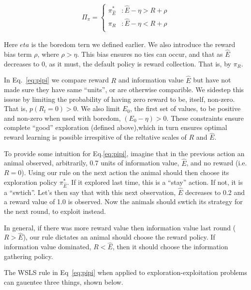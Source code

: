 \begin{equation} 
    \label{eq:pipi}
    \begin{split}
        \Pi_{\pi} = 
        \begin{cases}
            \pi^*_{\hat{E}} & : \hat{E} - \eta > R + \rho \\
            \pi_R 	& : \hat{E} - \eta < R + \rho \\
        \end{cases}
    \end{split}
\end{equation}

Here $eta$ is the boredom tern we defined earlier. We also introduce the reward bias term $\rho$, where $\rho > \eta$. This bias ensures no ties can occur, and that as $\hat E$ decreases to 0, as it must, the default policy is reward collection. That is, by $\pi_R$.

In Eq.~\ref{eq:pipi} we compare reward $R$ and information value $\hat E$ but have not made sure they have same ``units'', or are otherwise comparible. We sidestep this isssue by limiting the probability of having zero reward to be, itself, non-zero. That is, $p(R_t=0) > 0$. We also limit $E_0$, the first set of values, to be positive and non-zero when used with boredom, $(E_0 - \eta) > 0$. These constraints ensure complete ``good'' exploration (defined above),which in turn ensures optimal reward learning is possible irrespitive of the reltative scales of $R$ and $\hat E$.

To provide some intuition for Eq.\ref{eq:pipi}, imagine that in the previous action an animal observed, arbitrarily, 0.7 units of information value, $\hat E$, and no reward (i.e. $R = 0$). Using our rule on the next action the animal should then choose its exploration policy $\pi^*_{\hat{E}}$. If it explored last time, this is a ``stay'' action. If not, it is a ``swtich''. Let's then say that with this next observation, $\hat E$ decreases to 0.2 and a reward value of 1.0 is observed. Now the animals should swtich its strategy for the next round, to exploit instead. 

In general, if there was more reward value then information value last round ($R > \hat E$), our rule dictates an animal should choose the reward policy. If information value dominated, $R < \hat E$, then it should choose the information gathering policy.

The WSLS rule in Eq~\ref{eq:pipi} when applied to exploration-exploitation problems can gauentee three things, shown below. 

